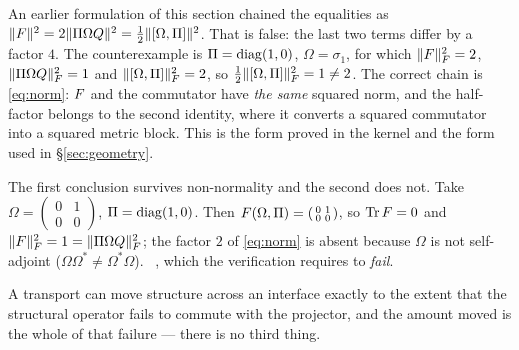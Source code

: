 \begin{remark}\label{rem:corrected-chain}
An earlier formulation of this section chained the equalities as
$\lVert F\rVert^2=2\lVert\Pi\Omega Q\rVert^2=\tfrac12\lVert[\Omega,\Pi]\rVert^2$. That is false: the last
two terms differ by a factor $4$. The counterexample is $\Pi=\operatorname{diag}(1,0)$,
$\Omega=\sigma_1$, for which $\lVert F\rVert_F^2=2$, $\lVert\Pi\Omega Q\rVert_F^2=1$ and
$\lVert[\Omega,\Pi]\rVert_F^2=2$, so $\tfrac12\lVert[\Omega,\Pi]\rVert_F^2=1\neq 2$. The correct chain is
\eqref{eq:norm}: $F$ and the commutator have \emph{the same} squared norm, and the half-factor
belongs to the second identity, where it converts a squared commutator into a squared metric
block. This is the form proved in the kernel and the form used in \S\ref{sec:geometry}.
\end{remark}

\begin{example}\label{ex:nonnormal}
The first conclusion survives non-normality and the second does not. Take
$\Omega=\left(\begin{smallmatrix}0&1\\0&0\end{smallmatrix}\right)$, $\Pi=\operatorname{diag}(1,0)$. Then
$F(\Omega,\Pi)=\left(\begin{smallmatrix}0&1\\0&0\end{smallmatrix}\right)$, so $\operatorname{Tr}F=0$ and
$\lVert F\rVert_F^2=1=\lVert\Pi\Omega Q\rVert_F^2$; the factor $2$ of \eqref{eq:norm} is absent because
$\Omega$ is not self-adjoint ($\Omega\Omega^*\neq\Omega^*\Omega$). \V\ , which the verification requires
to \emph{fail}.
\end{example}

\begin{remark}
A transport can move structure across an interface exactly to the extent that the structural
operator fails to commute with the projector, and the amount moved is the whole of that
failure --- there is no third thing.
\end{remark}
